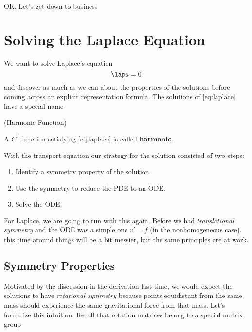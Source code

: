 \documentclass{bkcnotes}
\begin{document}
\maketitle

OK. Let's get down to business

\section{Solving the Laplace Equation}
We want to solve Laplace's equation
\begin{equation}
  \label{eq:laplace}
  \lap u = 0
\end{equation}
and discover as much as we can about the properties of the solutions
before coming across an explicit representation formula. The solutions
of \eqref{eq:laplace} have a special name

\begin{ndefn}(Harmonic Function)
  
  A $C^2$ function satisfying \eqref{eq:laplace} is called
  \textbf{harmonic}.
\end{ndefn}

With the transport equation our strategy for the solution consisted of
two steps:
\begin{enumerate}
\item Identify a symmetry property of the solution.
\item Use the symmetry to reduce the PDE to an ODE.
\item Solve the ODE.
\end{enumerate}
For Laplace, we are going to run with this again. Before we had
\emph{translational symmetry} and the ODE was a simple one $v' = f$
(in the nonhomogeneous case). this time around things will be a bit
messier, but the same principles are at work.

\subsection{Symmetry Properties}
Motivated by the discussion in the derivation last time, we would
expect the solutions to have \emph{rotational symmetry} because points
equidistant from the same mass should experience the same
gravitational force from that mass. Let's formalize this
intuition. Recall that rotation matrices belong to a special matrix
group
\end{document}
